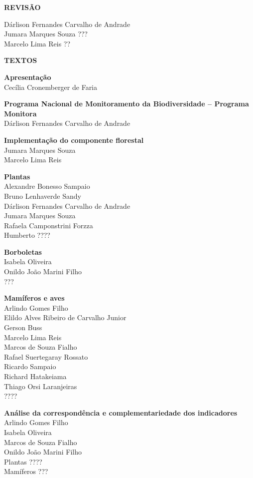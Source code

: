 \documentclass[
  letterpaper,
]{scrbook}
\begin{document}
\textbf{REVISÃO}

Dárlison Fernandes Carvalho de Andrade\\
Jumara Marques Souza ???\\
Marcelo Lima Reis ??

\textbf{TEXTOS}

\textbf{Apresentação}\\
Cecília Cronemberger de Faria

\textbf{Programa Nacional de Monitoramento da Biodiversidade -- Programa
Monitora}\\
Dárlison Fernandes Carvalho de Andrade

\textbf{Implementação do componente florestal}\\
Jumara Marques Souza\\
Marcelo Lima Reis

\textbf{Plantas}\\
Alexandre Bonesso Sampaio\\
Bruno Lenhaverde Sandy\\
Dárlison Fernandes Carvalho de Andrade\\
Jumara Marques Souza\\
Rafaela Camponstrini Forzza\\
Humberto ????

\textbf{Borboletas}\\
Isabela Oliveira\\
Onildo João Marini Filho\\
???

\textbf{Mamíferos e aves}\\
Arlindo Gomes Filho\\
Elildo Alves Ribeiro de Carvalho Junior\\
Gerson Buss\\
Marcelo Lima Reis\\
Marcos de Souza Fialho\\
Rafael Suertegaray Rossato\\
Ricardo Sampaio\\
Richard Hatakeiama\\
Thiago Orsi Laranjeiras\\
????

\textbf{Análise da correspondência e complementariedade dos
indicadores}\\
Arlindo Gomes Filho\\
Isabela Oliveira\\
Marcos de Souza Fialho\\
Onildo João Marini Filho\\
Plantas ????\\
Mamíferos ???
\end{document}
